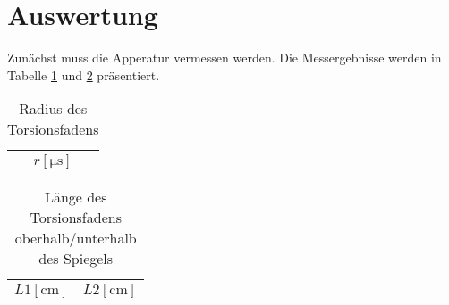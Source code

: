 \section{Auswertung}
\label{sec:Auswertung}

Zunächst muss die Apperatur vermessen werden.
Die Messergebnisse werden in Tabelle \ref{tab:1} und \ref{tab:2} präsentiert.

\begin{table}[H]
  \centering
  \caption{Radius des Torsionsfadens}
  \label{tab:1}
  \begin{tabular}{c}
    \toprule
    {$r [\si{\micro\second}]$}\\
    \midrule
    
    \bottomrule
  \end{tabular}
\end{table}

\begin{table}[H]
  \centering
  \caption{Länge des Torsionsfadens oberhalb/unterhalb des Spiegels}
  \label{tab:2}
  \begin{tabular}{c c}
    \toprule
    {$L1 [\si{\centi\metre}]$} & {$L2 [\si{\centi\metre}]$}\\
    \midrule
    
    \bottomrule
  \end{tabular}
\end{table}

















%
%    
%
